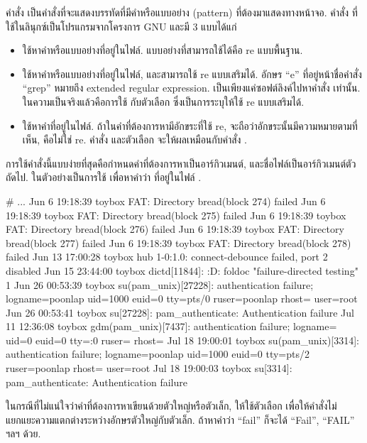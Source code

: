 \begin{thwbr}
คำสั่ง  เป็นคำสั่งที่จะแสดงบรรทัดที่มีคำหรือแบบอย่าง (pattern) ที่ต้องมาแสดงทางหน้าจอ. คำสั่ง  ที่ใช้ในลินุกซ์เป็นโปรแกรมจากโครงการ GNU และมี 3 แบบได้แก่
\begin{itemize}
\item {} ใช้หาคำหรือแบบอย่างที่อยู่ในไฟล์. แบบอย่างที่สามารถใช้ได้คือ re แบบพื้นฐาน.
\item {} ใช้หาคำหรือแบบอย่างที่อยู่ในไฟล์, และสามารถใช้ re แบบเสริมได้. อักษร ``e'' ที่อยู่หน้าชื่อคำสั่ง ``grep'' หมายถึง extended regular expression.  เป็นเพียงแค่ซอฟต์ลิงค์ไปหาคำสั่ง  เท่านั้น. ในความเป็นจริงแล้วคือการใช้  กับตัวเลือก  ซึ่งเป็นการระบุให้ใช้ re แบบเสริมได้.
\item {} ใช้หาคำที่อยู่ในไฟล์. ถ้าในคำที่ต้องการหามีอักขระที่ใช้ re,  จะถือว่าอักขระนั้นมีความหมายตามที่เห็น, คือไม่ใช่ re. คำสั่ง  และตัวเลือก  จะให้ผลเหมือนกับคำสั่ง .
\end{itemize}

การใช้คำสั่งนี้แบบง่ายที่สุดคือกำหนดคำที่ต้องการหาเป็นอาร์กิวเมนต์, และชื่อไฟล์เป็นอาร์กิวเมนต์ตัวถัดไป. ในตัวอย่างเป็นการใช้  เพื่อหาคำว่า  ที่อยู่ในไฟล์ .
\begin{MyExample}
\begin{MyEx}
# 
...
Jun  6 19:18:39 toybox FAT: Directory bread(block 274) failed
Jun  6 19:18:39 toybox FAT: Directory bread(block 275) failed
Jun  6 19:18:39 toybox FAT: Directory bread(block 276) failed
Jun  6 19:18:39 toybox FAT: Directory bread(block 277) failed
Jun  6 19:18:39 toybox FAT: Directory bread(block 278) failed
Jun 13 17:00:28 toybox hub 1-0:1.0: connect-debounce failed, port 2 disabled
Jun 15 23:44:00 toybox dictd[11844]: :D: foldoc "failure-directed testing" 1
Jun 26 00:53:39 toybox su(pam_unix)[27228]: authentication failure; \wrap
logname=poonlap uid=1000 euid=0 tty=pts/0 ruser=poonlap rhost=  user=root
Jun 26 00:53:41 toybox su[27228]: pam_authenticate: Authentication failure
Jul 11 12:36:08 toybox gdm(pam_unix)[7437]: authentication failure; \wrap
logname= uid=0 euid=0 tty=:0 ruser= rhost=
Jul 18 19:00:01 toybox su(pam_unix)[3314]: authentication failure; \wrap
logname=poonlap uid=1000 euid=0 tty=pts/2 ruser=poonlap rhost=  user=root
Jul 18 19:00:03 toybox su[3314]: pam_authenticate: Authentication failure
\end{MyEx}
\end{MyExample}
ในกรณีที่ไม่แน่ใจว่าคำที่ต้องการหาเขียนด้วยตัวใหญ่หรือตัวเล็ก, ให้ใช้ตัวเลือก   เพื่อให้คำสั่งไม่แยกแยะความแตกต่างระหว่างอักษรตัวใหญ่กับตัวเล็ก. ถ้าหาคำว่า ``fail'' ก็จะได้ ``Fail'', ``FAIL'' ฯลฯ ด้วย. 


\end{thwbr}
